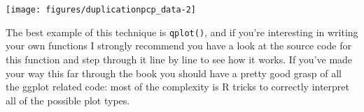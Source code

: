 \begin{Shaded}
\begin{Highlighting}[]
\NormalTok{>}\StringTok{ }\StringTok{ }\NormalTok{(} 
\end{Highlighting}
\end{Shaded}

\begin{flushleft}\texttt{[image: figures/duplicationpcp\_data-2]} \end{flushleft}

The best example of this technique is \texttt{qplot()}, and if you're
interesting in writing your own functions I strongly recommend you have
a look at the source code for this function and step through it line by
line to see how it works. If you've made your way this far through the
book you should have a pretty good grasp of all the ggplot related code:
most of the complexity is R tricks to correctly interpret all of the
possible plot types.
